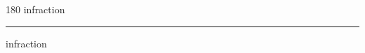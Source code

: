 
\begin{frame}
\begin{center}
\begin{turn}{180}
{\fontsize{2.5cm}{1em}\selectfont infraction}
\end{turn}
\vspace{1em}\par  
\hrule
\vspace{1em}\par  
{\fontsize{2.5cm}{1em}\selectfont infraction}
\end{center}
\end{frame}
